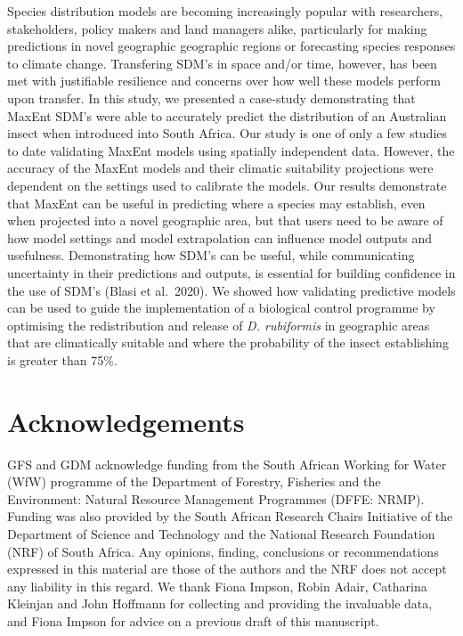 \documentclass[12pt,]{article}
\begin{document}
Species distribution models are becoming increasingly popular with
researchers, stakeholders, policy makers and land managers alike,
particularly for making predictions in novel geographic geographic
regions or forecasting species responses to climate change. Transfering
SDM's in space and/or time, however, has been met with justifiable
resilience and concerns over how well these models perform upon
transfer. In this study, we presented a case-study demonstrating that
MaxEnt SDM's were able to accurately predict the distribution of an
Australian insect when introduced into South Africa. Our study is one of
only a few studies to date validating MaxEnt models using spatially
independent data. However, the accuracy of the MaxEnt models and their
climatic suitability projections were dependent on the settings used to
calibrate the models. Our results demonstrate that MaxEnt can be useful
in predicting where a species may establish, even when projected into a
novel geographic area, but that users need to be aware of how model
settings and model extrapolation can influence model outputs and
usefulness. Demonstrating how SDM's can be useful, while communicating
uncertainty in their predictions and outputs, is essential for building
confidence in the use of SDM's (Blasi et al.~2020). We showed how
validating predictive models can be used to guide the implementation of
a biological control programme by optimising the redistribution and
release of \emph{D. rubiformis} in geographic areas that are
climatically suitable and where the probability of the insect
establishing is greater than 75\%.

\hypertarget{acknowledgements}{%
\section{Acknowledgements}\label{acknowledgements}}

GFS and GDM acknowledge funding from the South African Working for Water
(WfW) programme of the Department of Forestry, Fisheries and the
Environment: Natural Resource Management Programmes (DFFE: NRMP).
Funding was also provided by the South African Research Chairs
Initiative of the Department of Science and Technology and the National
Research Foundation (NRF) of South Africa. Any opinions, finding,
conclusions or recommendations expressed in this material are those of
the authors and the NRF does not accept any liability in this regard. We
thank Fiona Impson, Robin Adair, Catharina Kleinjan and John Hoffmann
for collecting and providing the invaluable data, and Fiona Impson for
advice on a previous draft of this manuscript.
\end{document}
